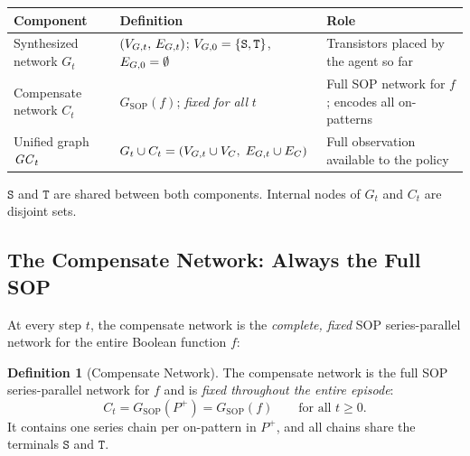 \documentclass[11pt, a4paper]{article}
\theoremstyle{plain}
\theoremstyle{definition}
\newtheorem{definition}[theorem]{Definition}
\theoremstyle{remark}
\newcommand{\SOURCE}{\texttt{S}}
\newcommand{\SINK}{\texttt{T}}
\newcommand{\Pplus}{P^{+}}
\newcommand{\VG}[1][]{V_{G\if\relax\detokenize{#1}\relax\else,#1\fi}}
\newcommand{\EG}[1][]{E_{G\if\relax\detokenize{#1}\relax\else,#1\fi}}
\newcommand{\VC}[1][]{V_{C\if\relax\detokenize{#1}\relax\else,#1\fi}}
\newcommand{\EC}[1][]{E_{C\if\relax\detokenize{#1}\relax\else,#1\fi}}
\newcommand{\GC}[1][]{\mathit{GC}\if\relax\detokenize{#1}\relax\else_{#1}\fi}
\begin{document}
\begin{center}
\renewcommand{\arraystretch}{1.35}
\begin{tabularx}{\linewidth}{%
  >{\raggedright\arraybackslash}p{3.2cm}%
  >{\raggedright\arraybackslash}X%
  >{\raggedright\arraybackslash}p{4.0cm}}
\toprule
\textbf{Component} & \textbf{Definition} & \textbf{Role} \\
\midrule
Synthesized network $G_t$ &
  $(\VG[t],\,\EG[t])$;\; $\VG[0]=\{\SOURCE,\SINK\}$, $\EG[0]=\emptyset$ &
  Transistors placed by the agent so far \\[4pt]
Compensate network $C_t$ &
  $G_{\mathrm{SOP}}(f)$;\; \textit{fixed for all} $t$ &
  Full SOP network for $f$; encodes all on-patterns \\[4pt]
Unified graph $\GC[t]$ &
  $G_t \cup C_t = (\VG[t]\cup\VC[],\;\EG[t]\cup\EC[])$ &
  Full observation available to the policy \\
\bottomrule
\end{tabularx}
\end{center}

$\SOURCE$ and $\SINK$ are shared between both components.
Internal nodes of $G_t$ and $C_t$ are disjoint sets.

\subsection{The Compensate Network: Always the Full SOP}

At every step $t$, the compensate network is the \emph{complete, fixed}
SOP series-parallel network for the entire Boolean function $f$:

\begin{definition}[Compensate Network]
The compensate network is the full SOP series-parallel network for $f$
and is \emph{fixed throughout the entire episode}:
\[
  C_t = G_{\mathrm{SOP}}(\Pplus) = G_{\mathrm{SOP}}(f)
  \qquad \text{for all } t \geq 0.
\]
It contains one series chain per on-pattern in $\Pplus$, and all
chains share the terminals $\SOURCE$ and $\SINK$.
\end{definition}
\end{document}

